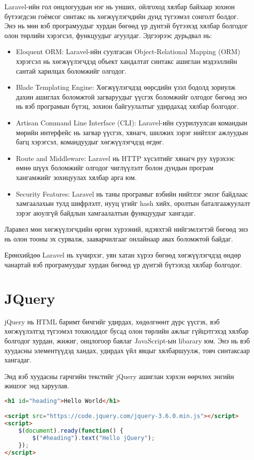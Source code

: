 Laravel-ийн гол онцлогуудын нэг нь унших, ойлгоход хялбар байхаар зохион бүтээгдсэн гоёмсог синтакс нь хөгжүүлэгчдийн дунд түгээмэл сонголт болдог. Энэ нь мөн вэб програмуудыг хурдан бөгөөд үр дүнтэй бүтээхэд хялбар болгодог олон төрлийн хэрэгсэл, функцуудыг агуулдаг. Эдгээрээс дурьдвал нь:
\begin{itemize}
	\item Eloquent ORM: Laravel-ийн суулгасан Object-Relational Mapping         (ORM) хэрэгсэл нь хөгжүүлэгчдэд объект хандалтат синтакс ашиглан 
        мэдээллийн сантай харилцах боломжийг олгодог.
        \item Blade Templating Engine: Хөгжүүлэгчдэд өөрсдийн үзэл бодолд зориулж дахин ашиглах боломжтой загваруудыг үүсгэх боломжийг олгодог бөгөөд энэ нь вэб програмын бүтэц, зохион байгуулалтыг удирдахад хялбар болгодог.
        \item Artisan Command Line Interface (CLI): Laravel-ийн суурилуулсан командын мөрийн интерфейс нь загвар үүсгэх, хянагч, шилжих зэрэг нийтлэг ажлуудын багц хэрэгсэл, командуудыг хөгжүүлэгчдэд өгдөг.
        \item Route and Middleware: Laravel нь HTTP хүсэлтийг хянагч руу хүрэхээс өмнө шүүх боломжийг олгодог чиглүүлэлт болон дундын програм хангамжийг зохицуулах хялбар арга юм.
        \item Security Features: Laravel нь таны програмыг вэбийн нийтлэг эмзэг байдлаас хамгаалахын тулд шифрлэлт, нууц үгийг hash хийх, оролтын баталгаажуулалт зэрэг аюулгүй байдлын хамгаалалтын функцуудыг хангадаг.
\end{itemize}

Ларавел мөн хөгжүүлэгчдийн өргөн хүрээний, идэвхтэй нийгэмлэгтэй бөгөөд энэ нь олон тооны эх сурвалж, зааварчилгааг онлайнаар авах боломжтой байдаг.

Ерөнхийдөө Laravel нь хүчирхэг, уян хатан хүрээ бөгөөд хөгжүүлэгчдэд өндөр чанартай вэб програмуудыг хурдан бөгөөд үр дүнтэй бүтээхэд хялбар болгодог.

\section{JQuery}
jQuery нь HTML баримт бичгийг удирдах, хөдөлгөөнт дүрс үүсгэх, вэб хөгжүүлэлтэд түгээмэл тохиолддог бусад олон төрлийн ажлыг гүйцэтгэхэд хялбар болгодог хурдан, жижиг, онцлогоор баялаг JavaScript-ын libarary юм. Энэ нь вэб хуудасны элементүүдэд хандах, удирдах үйл явцыг хялбаршуулж, товч синтаксаар хангадаг.

Энд вэб хуудасны гарчгийн текстийг jQuery ашиглан хэрхэн өөрчлөх энгийн жишээг энд харуулав.

\begin{lstlisting}[language=Html, caption=JQuery ашиглаж буй байдал, frame=single]
<h1 id="heading">Hello World</h1>

<script src="https://code.jquery.com/jquery-3.6.0.min.js"></script>
<script>
    $(document).ready(function() {
        $("#heading").text("Hello jQuery");
    });
</script>
\end{lstlisting}